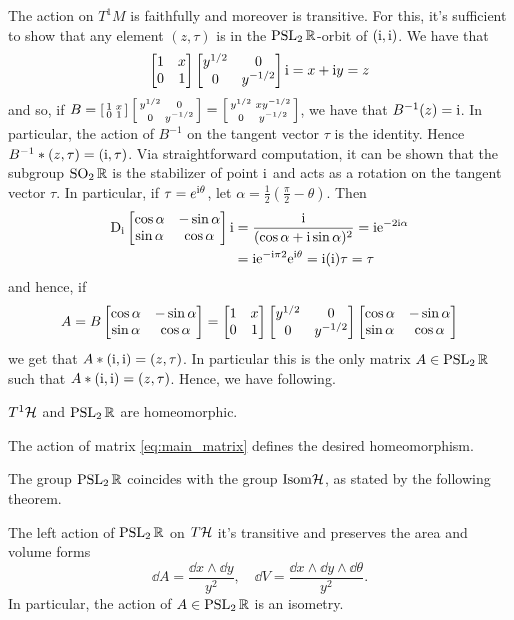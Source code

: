 The action on $T^{1}M$ is faithfully and moreover is transitive. For this, it's sufficient to show that any element $(z,\tau)$ is in the $\operatorname{PSL}_{2}\mathbb{R}$-orbit of $(\mathrm{i},\mathrm{i})$. We have that
\[
\begin{bmatrix} 1&x\\0&1 \end{bmatrix}\begin{bmatrix} y^{1/2}&0\\0&y^{-1/2} \end{bmatrix}\mathrm{i}=x+\mathrm{i} y=z
\] 
and so, if $B=\left[\begin{smallmatrix} 1&x\\0&1 \end{smallmatrix}\right]\left[\begin{smallmatrix} y^{1/2}&0\\0&y^{-1/2} \end{smallmatrix}\right]=\left[\begin{smallmatrix} y^{1/2}&xy^{-1/2}\\0&y^{-1/2} \end{smallmatrix}\right]$, we have that $B^{-1}(z)=\mathrm{i}$. In particular, the action of $B^{-1}$ on the tangent vector $\tau$ is the identity. Hence $B^{-1}\ast(z,\tau)=(\mathrm{i},\tau)$. Via straightforward computation, it can be shown that the subgroup $\operatorname{SO}_{2}\mathbb{R}$ is the stabilizer of point $\mathrm{i}$ and acts as a rotation on the tangent vector $\tau$. In particular, if $\tau=e^{\mathrm{i}\theta}$, let $\alpha=\frac{1}{2}\left(\frac{\pi}{2}-\theta\right)$. Then
\begin{align*}
\operatorname{D}_{\mathrm{i}}\begin{bmatrix} \cos\alpha&-\sin\alpha\\ \sin\alpha&\cos\alpha \end{bmatrix}\mathrm{i}&=\frac{\mathrm{i}}{(\cos\alpha+\mathrm{i}\sin\alpha)^{2}}=\mathrm{i} \mathrm{e}^{-2\mathrm{i}\alpha}\\
&=\mathrm{i} \mathrm{e}^{-\mathrm{i}\pi2}\mathrm{e}^{\mathrm{i}\theta}=\mathrm{i}(\mathrm{i})\tau=\tau
\end{align*}
and hence, if
\begin{equation}
\label{eq:main_matrix}
A=B\begin{bmatrix} \cos\alpha&-\sin\alpha\\\sin\alpha&\cos\alpha \end{bmatrix}=\begin{bmatrix} 1&x\\0&1 \end{bmatrix}\begin{bmatrix} y^{1/2}&0\\0&y^{-1/2} \end{bmatrix}\begin{bmatrix} \cos\alpha&-\sin\alpha\\\sin\alpha&\cos\alpha \end{bmatrix}
\end{equation}
we get that $A\ast(\mathrm{i},\mathrm{i})=(z,\tau)$. In particular this is the only matrix $A\in\operatorname{PSL}_{2}\mathbb{R}$ such that $A\ast(\mathrm{i},\mathrm{i})=(z,\tau)$. Hence, we have following.
\begin{nlem}
\label{lem:t1h_psl2_identification}
$T^{1}\mathcal{H}$ and $\operatorname{PSL}_{2}\mathbb{R}$ are homeomorphic.
\end{nlem}
\begin{prf}
The action of matrix \eqref{eq:main_matrix} defines the desired homeomorphism.
\end{prf}

The group $\operatorname{PSL}_{2}\mathbb{R}$ coincides with the group $\mathrm{Isom}\mathcal{H}$, as stated by the following theorem.

\begin{nteo}
\label{teo:area_volume_forms_invariants_isometries}
The left action of $\operatorname{PSL}_{2}\mathbb{R}$ on $T\mathcal{H}$ it's transitive and preserves the area and volume forms
\[
\dd A=\frac{\dd x\wedge\dd y}{y^{2}},\quad\dd V=\frac{\dd x\wedge\dd y\wedge\dd\theta}{y^{2}}.
\]
In particular, the action of $A\in\operatorname{PSL}_{2}\mathbb{R}$ is an isometry.
\end{nteo}


